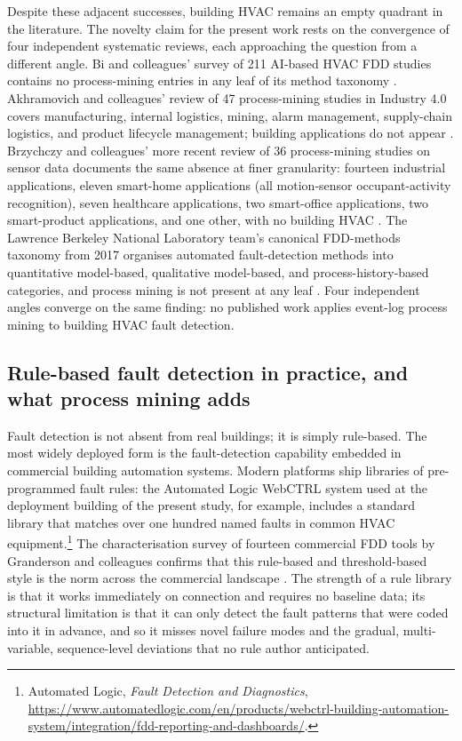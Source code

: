 \documentclass[11pt,letterpaper]{article}
\begin{document}
Despite these adjacent successes, building HVAC remains an empty quadrant in the literature. The novelty claim for the present work rests on the convergence of four independent systematic reviews, each approaching the question from a different angle. Bi and colleagues' survey of 211 AI-based HVAC FDD studies contains no process-mining entries in any leaf of its method taxonomy \cite{bi2024aihvacreview}. Akhramovich and colleagues' review of 47 process-mining studies in Industry 4.0 covers manufacturing, internal logistics, mining, alarm management, supply-chain logistics, and product lifecycle management; building applications do not appear \cite{akhramovich2024pmindustry40}. Brzychczy and colleagues' more recent review of 36 process-mining studies on sensor data documents the same absence at finer granularity: fourteen industrial applications, eleven smart-home applications (all motion-sensor occupant-activity recognition), seven healthcare applications, two smart-office applications, two smart-product applications, and one other, with no building HVAC \cite{brzychczy2025pmsensorreview}. The Lawrence Berkeley National Laboratory team's canonical FDD-methods taxonomy from 2017 organises automated fault-detection methods into quantitative model-based, qualitative model-based, and process-history-based categories, and process mining is not present at any leaf \cite{granderson2017fddtoolsurvey}. Four independent angles converge on the same finding: no published work applies event-log process mining to building HVAC fault detection.

\subsection{Rule-based fault detection in practice, and what process mining adds}

Fault detection is not absent from real buildings; it is simply rule-based. The most widely deployed form is the fault-detection capability embedded in commercial building automation systems. Modern platforms ship libraries of pre-programmed fault rules: the Automated Logic WebCTRL system used at the deployment building of the present study, for example, includes a standard library that matches over one hundred named faults in common HVAC equipment.\footnote{Automated Logic, \emph{Fault Detection and Diagnostics}, \url{https://www.automatedlogic.com/en/products/webctrl-building-automation-system/integration/fdd-reporting-and-dashboards/}.} The characterisation survey of fourteen commercial FDD tools by Granderson and colleagues confirms that this rule-based and threshold-based style is the norm across the commercial landscape \cite{granderson2017fddtoolsurvey}. The strength of a rule library is that it works immediately on connection and requires no baseline data; its structural limitation is that it can only detect the fault patterns that were coded into it in advance, and so it misses novel failure modes and the gradual, multi-variable, sequence-level deviations that no rule author anticipated.
\end{document}
